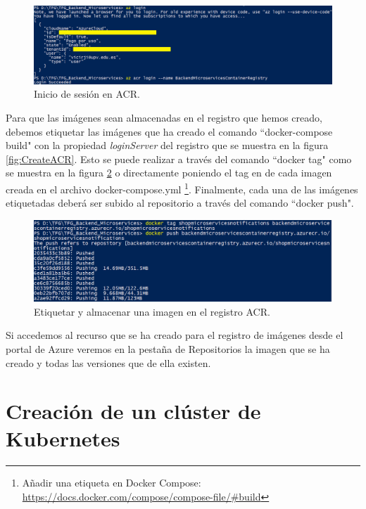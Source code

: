 \documentclass[11pt,spanish,listoffigures]{tfgetsinf}
\begin{document}
\begin{figure}[h]
\centering
\includegraphics[scale=0.50]{LoginAcr}
\caption{Inicio de sesión en ACR.}
\label{fig:LoginAcr}
\end{figure}

Para que las imágenes sean almacenadas en el registro que hemos creado, debemos etiquetar las imágenes que ha creado el comando ``docker-compose build" con la propiedad \textit{loginServer} del registro que se muestra en la figura \ref{fig:CreateACR}. Esto se puede realizar a través del comando ``docker tag" como se muestra en la figura \ref{fig:PushImage} o directamente poniendo el tag en de cada imagen creada en el archivo docker-compose.yml \footnote{ Añadir una etiqueta en Docker Compose: \url{https://docs.docker.com/compose/compose-file/\#build}}. Finalmente, cada una de las imágenes etiquetadas deberá ser subido al repositorio a través del comando ``docker push".

\begin{figure}[h]
\centering
\includegraphics[scale=0.6]{PushImage}
\caption{Etiquetar y almacenar una imagen en el registro ACR.}
\label{fig:PushImage}
\end{figure}

Si accedemos al recurso que se ha creado para el registro de imágenes desde el portal de Azure veremos en la pestaña de Repositorios la imagen que se ha creado y todas las versiones que de ella existen.

\newpage

\section{Creación de un clúster de Kubernetes} 
\end{document}
